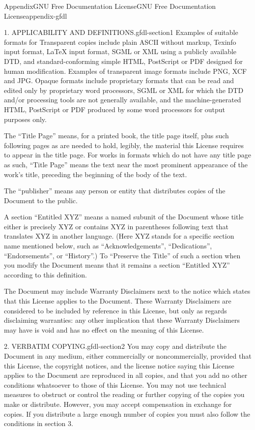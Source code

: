 \documentclass[oneside,10pt,]{book}
\numberwithin{equation}{section}
\begin{document}
\begin{appendixptx}{Appendix}{GNU Free Documentation License}{}{GNU Free Documentation License}{}{}{appendix-gfdl}
\begin{paragraphs}{1. APPLICABILITY AND DEFINITIONS.}{gfdl-section1}
Examples of suitable formats for Transparent copies include plain ASCII without markup, Texinfo input format, LaTeX input format, SGML or XML using a publicly available DTD, and standard-conforming simple HTML, PostScript or PDF designed for human modification. Examples of transparent image formats include PNG, XCF and JPG. Opaque formats include proprietary formats that can be read and edited only by proprietary word processors, SGML or XML for which the DTD and\slash{}or processing tools are not generally available, and the machine-generated HTML, PostScript or PDF produced by some word processors for output purposes only.%
\par
The ``Title Page'' means, for a printed book, the title page itself, plus such following pages as are needed to hold, legibly, the material this License requires to appear in the title page. For works in formats which do not have any title page as such, ``Title Page'' means the text near the most prominent appearance of the work's title, preceding the beginning of the body of the text.%
\par
The ``publisher'' means any person or entity that distributes copies of the Document to the public.%
\par
A section ``Entitled XYZ'' means a named subunit of the Document whose title either is precisely XYZ or contains XYZ in parentheses following text that translates XYZ in another language. (Here XYZ stands for a specific section name mentioned below, such as ``Acknowledgements'', ``Dedications'', ``Endorsements'', or ``History''.) To ``Preserve the Title'' of such a section when you modify the Document means that it remains a section ``Entitled XYZ'' according to this definition.%
\par
The Document may include Warranty Disclaimers next to the notice which states that this License applies to the Document. These Warranty Disclaimers are considered to be included by reference in this License, but only as regards disclaiming warranties: any other implication that these Warranty Disclaimers may have is void and has no effect on the meaning of this License.%
\end{paragraphs}%
\begin{paragraphs}{2. VERBATIM COPYING.}{gfdl-section2}%
You may copy and distribute the Document in any medium, either commercially or noncommercially, provided that this License, the copyright notices, and the license notice saying this License applies to the Document are reproduced in all copies, and that you add no other conditions whatsoever to those of this License. You may not use technical measures to obstruct or control the reading or further copying of the copies you make or distribute. However, you may accept compensation in exchange for copies. If you distribute a large enough number of copies you must also follow the conditions in section 3.%

\end{paragraphs}
\end{appendixptx}
\end{document}
